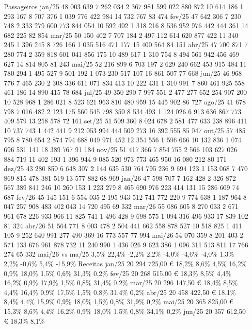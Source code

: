 \documentclass[
  a4paper,
]{article}
\begin{document}
Passageiros jan/25 48 003 639 7 262 034 2 367 981 599 022 880 872 10 614
186 1 293 167 8 707 376 1 039 776 422 984 14 732 767 83 474 fev/25 47
642 306 7 230 748 2 333 279 600 773 844 054 10 592 402 1 318 216 8 536
952 976 442 444 361 14 682 225 82 854 mar/25 50 150 402 7 707 184 2 497
112 614 620 877 422 11 340 245 1 396 245 8 726 166 1 035 516 471 177 15
400 564 84 151 abr/25 47 700 871 7 280 774 2 359 818 601 041 856 175 10
489 617 1 310 754 8 494 561 942 456 469 627 14 814 805 81 243 mai/25 52
216 899 6 703 197 2 629 240 662 453 915 484 11 780 294 1 495 527 9 501
192 1 073 230 517 107 16 861 507 77 668 jun/25 46 968 776 7 465 230 2
308 336 611 071 834 413 10 222 431 1 310 991 7 860 461 925 558 461 186
14 890 415 78 684 jul/25 49 350 290 7 997 551 2 477 277 652 254 907 200
10 528 968 1 286 021 8 523 621 963 810 480 959 15 445 902 86 727 ago/25
41 678 798 7 016 482 2 123 175 560 545 798 350 8 534 493 1 124 026 6 913
636 867 773 409 579 13 258 578 72 161 set/25 51 509 360 8 024 678 2 581
477 633 238 896 411 10 737 743 1 442 441 9 212 053 994 444 509 273 16
392 555 85 047 out/25 57 485 795 8 780 654 2 874 794 688 049 971 452 12
354 556 1 596 666 10 132 836 1 074 696 531 141 18 389 767 91 184 nov/25
51 417 366 7 854 755 2 566 103 627 026 884 719 11 402 193 1 396 944 9
085 520 973 773 465 950 16 080 212 80 171 dez/25 43 280 850 6 648 307 2
144 635 530 764 795 236 9 694 123 1 153 068 7 470 869 815 478 381 519 13
577 882 68 969 jan/26 47 598 707 7 162 428 2 326 872 567 389 841 246 10
260 153 1 223 279 8 465 690 976 223 414 131 15 286 609 74 687 fev/26 45
145 151 6 554 035 2 195 943 512 741 772 220 9 774 638 1 187 964 8 047
257 908 483 402 043 14 720 495 69 332 mar/26 55 086 605 8 270 033 2 671
961 678 226 933 966 11 825 741 1 496 428 9 698 575 1 094 316 496 933 17
839 102 81 324 abr/26 51 564 771 8 003 478 2 504 441 662 558 878 527 10
518 825 1 411 105 9 252 640 991 277 490 369 16 773 557 77 994 mai/26 54
070 359 8 201 403 2 571 133 676 961 878 732 11 240 990 1 436 026 9 623
386 1 096 311 513 811 17 766 274 65 332 mai/26 vs ma/25 3,5\% 22,4\%
-2,2\% 2,2\% -4,0\% -4,6\% -4,0\% 1,3\% 2,2\% -0,6\% 5,4\% -15,9\%
Receitas jan/25 20 294 725,00 € 18,2\% 8,6\% 4,5\% 16,2\% 0,9\% 18,0\%
1,5\% 0,6\% 31,3\% 0,2\% fev/25 20 268 515,00 € 18,3\% 8,5\% 4,4\%
16,2\% 0,9\% 17,9\% 1,5\% 0,8\% 31,4\% 0,2\% mar/25 20 296 147,50 €
18,4\% 8,5\% 4,4\% 16,4\% 0,9\% 17,5\% 1,5\% 0,8\% 31,4\% 0,2\% abr/25
20 458 422,50 € 18,1\% 8,4\% 4,4\% 15,9\% 0,9\% 18,0\% 1,5\% 0,8\%
31,9\% 0,2\% mai/25 20 365 825,00 € 15,3\% 8,6\% 4,4\% 16,2\% 0,9\%
18,0\% 1,5\% 0,8\% 34,1\% 0,2\% jun/25 20 357 612,50 € 18,3\% 8,1\%
\end{document}
